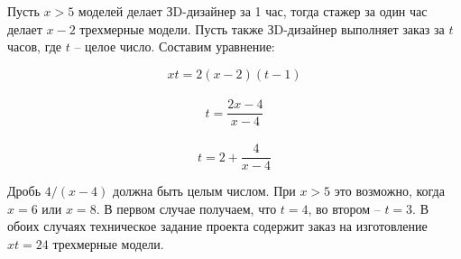 \solutionSection

Пусть $x>5$ моделей делает ЗD-дизайнер за 1 час, тогда стажер за один час делает $x-2$ трехмерные модели. Пусть также ЗD-дизайнер выполняет заказ за $t$ часов, где $t$ – целое число. Составим уравнение: 

\begin{displaymath}
xt=2(x-2)(t-1)
\end{displaymath}\\
\begin{displaymath}
t=\frac{2x-4}{x-4}
\end{displaymath}\\
\begin{displaymath}
t= 2 + \frac{4}{x-4}
\end{displaymath}

Дробь $4/(x-4)$ должна быть целым числом. При $x>5$ это возможно, когда $x=6$ или $x=8$. В первом случае получаем, что $t=4$, во втором – $t=3$. В обоих случаях техническое задание проекта содержит заказ на изготовление $xt=24$ трехмерные модели.

